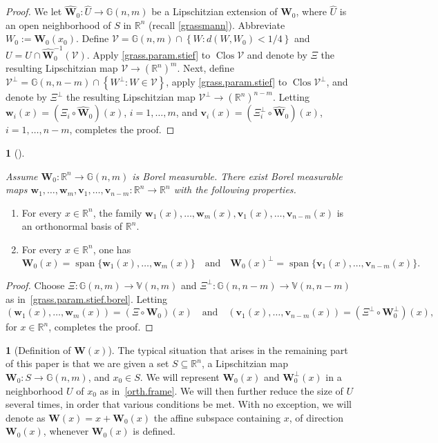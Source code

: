 \documentclass[11pt]{article}
\newcounter{cdrthm}[section]
\theoremstyle{definition}
\theoremstyle{jepanonymous}
\newtheorem{jepempty}[cdrthm]{}
\newenvironment{enonce}[2][remark]{\begin{jepempty}[#2]}{\end{jepempty}}
\theoremstyle{plain}
\newcommand{\quand}{\quad\text{and}\quad}
\newenvironment{Empty}[2][\null]{%
\begin{enonce}[remark]{#1}#2}
{\end{enonce}}
\newcommand{\R}{\mathbb{R}}
\newcommand{\Rn}{\R^n}
\newcommand{\calV}{\mathscr{V}}
\newcommand{\bW}{{\boldsymbol{W}}}
\newcommand{\bv}{{\boldsymbol{v}}}
\newcommand{\bw}{{\boldsymbol{w}}}
\newcommand{\bV}{\mathbb{V}}
\newcommand{\bG}{\mathbb{G}}
\DeclareMathOperator{\rmClos}{\mathrm{Clos}}
\DeclareMathOperator{\rmspan}{\mathrm{span}}
\let\wh\widehat
\let\subset\subseteq
\begin{document}
\begin{proof}
We let $\wh{\bW}_0: \wh{U} \to \bG(n,m)$ be a Lipschitzian extension of $\bW_0$, where $\wh{U}$ is an open neighborhood of $S$ in $\Rn$ (recall \ref{grassmann}).
Abbreviate $W_0:= \bW_0(x_0)$.
Define $\calV = \bG(n,m) \cap \left\{ W: d(W,W_0) < 1/4 \right\}$ and $U = \wh{U} \cap \wh{\bW}_0^{-1}(\calV)$.
Apply \ref{grass.param.stief} to $\rmClos \calV$ and denote by $\Xi$ the resulting Lipschitzian map $\calV \to (\Rn)^m$.
Next, define $\calV^\perp = \bG(n,n-m) \cap \left\{ W^\perp: W \in \calV \right\}$, apply \ref{grass.param.stief} to $\rmClos \calV^\perp$, and denote by $\Xi^\perp$ the resulting Lipschitzian map $\calV^\perp \to (\Rn)^{n-m}$.
Letting $\bw_i(x) =(\Xi_i \circ \wh{\bW}_0)(x)$, $i=1,\ldots,m$, and $\bv_i(x) =(\Xi^\perp_i \circ \wh{\bW}_0)(x)$, $i=1,\ldots,n-m$, completes the proof.
\end{proof}

\begin{Empty}[]
\label{orth.frame.borel}
{\it
Assume $\bW_0: \Rn \to \bG(n,m)$ is Borel measurable. There exist Borel measurable maps $\bw_1,\ldots,\bw_m,\bv_1,\ldots,\bv_{n-m}: \Rn \to \Rn$ with the following properties.
\begin{enumerate}
\item For every $x\!\in\!\Rn$, the family $\bw_1(x),\ldots,\bw_m(x),\bv_1(x),\ldots,\bv_{n-m}(x)$ is an ortho\-normal basis of $\Rn$.
\item For every $x \in\Rn$, one has
\begin{equation*}
\bW_0(x) = \rmspan \{ \bw_1(x),\ldots,\bw_m(x) \}
\quand\bW_0(x)^\perp = \rmspan \{ \bv_1(x),\ldots,\bv_{n-m}(x) \}.
\end{equation*}
\end{enumerate}
}
\end{Empty}

\begin{proof}
Choose $\Xi: \bG(n,m) \to \bV(n,m)$ and $\Xi^\perp: \bG(n,n-m) \to \bV(n,n-m)$ as in~\ref{grass.param.stief.borel}.
Letting
\[
\left(\bw_1(x),\ldots,\bw_m(x)\right) =(\Xi \circ \bW_0)(x)\quand\left(\bv_1(x),\ldots,\bv_{n-m}(x)\right) =(\Xi^\perp \circ \bW_0^\perp)(x),
\]
for $x \in \Rn$, completes the proof.
\end{proof}

\begin{Empty}[Definition of $\bW(x)$]
\label{W}
The typical situation that arises in the remaining part of this paper is that we are given a set $S \subset \Rn$, a Lipschitzian map $\bW_0: S \to \bG(n,m)$, and $x_0 \in S$.
We will represent $\bW_0(x)$ and $\bW_0^\perp(x)$ in a neighborhood $U$ of $x_0$ as in~\ref{orth.frame}.
We will then further reduce the size of $U$ several times, in order that various conditions be met.
With no exception, we will denote as $\bW(x) = x + \bW_0(x)$ the affine subspace containing $x$, of direction $\bW_0(x)$, whenever $\bW_0(x)$ is defined.
\end{Empty}
\end{document}
